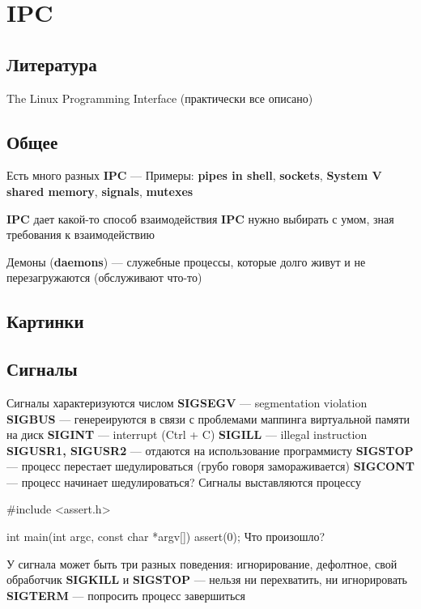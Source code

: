\chapter{IPC}


\section{Литература}
The Linux Programming Interface (практически все описано)

\section{Общее}
Есть много разных \textbf{IPC} --- 
Примеры: \textbf{pipes in shell}, \textbf{sockets}, \textbf{System V shared memory},
\textbf{signals}, \textbf{mutexes}

\textbf{IPC} дает какой-то способ взаимодействия
\textbf{IPC} нужно выбирать с умом, зная требования к взаимодействию

Демоны (\textbf{daemons}) --- служебные процессы, которые долго живут 
и не перезагружаются (обслуживают что-то)

\section{Картинки}

\section{Сигналы}
Сигналы характеризуются числом
\textbf{SIGSEGV} --- segmentation violation
\textbf{SIGBUS} --- генереируются в связи с проблемами маппинга виртуальной памяти на диск
\textbf{SIGINT} --- interrupt (Ctrl + C)
\textbf{SIGILL} --- illegal instruction
\textbf{SIGUSR1, SIGUSR2} --- отдаются на использование программисту
\textbf{SIGSTOP} --- процесс перестает шедулироваться (грубо говоря замораживается)
\textbf{SIGCONT} --- процесс начинает шедулироваться?
Сигналы выставляются процессу

#include <assert.h>

int main(int argc, const char *argv[]) {
    assert(0);
}
Что произошло?

У сигнала может быть три разных поведения: игнорирование, дефолтное, свой обработчик
\textbf{SIGKILL} и \textbf{SIGSTOP} --- нельзя ни перехватить, ни игнорировать
\textbf{SIGTERM} --- попросить процесс завершиться

